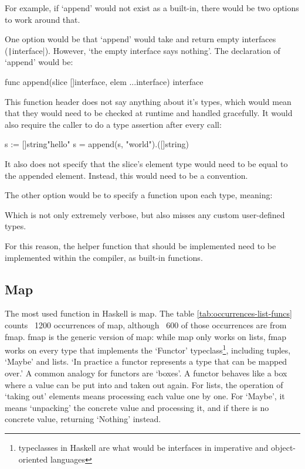 For example, if `append' would not exist as a built-in, there would be two options
to work around that.

One option would be that `append' would take and return empty interfaces
(\texttt|interface{}|). However, `the empty interface says
nothing'\autocite{empty-interface}. The declaration of `append' would be:
\begin{gocode}
  func append(slice []interface{}, elem ...interface{}) {}interface
\end{gocode}

This function header does not say anything about it's types, which would
mean that they would need to be checked at runtime and handled gracefully. It
would also require the caller to do a type assertion after every call:

\begin{gocode}
  s := []string{"hello"}
  s = append(s, "world").([]string)
\end{gocode}

It also does not specify that the slice's element type would need to be equal to
the appended element. Instead, this would need to be a convention.

The other option would be to specify a function upon each type, meaning:
\begin{gocode}
func appendInt(slice []int, elem ...int} []int
func appendString(slice []string, elem ...string} []string
...
\end{gocode}

Which is not only extremely verbose, but also misses any custom user-defined types.

For this reason, the helper function that should  be implemented need to
be implemented within the compiler, as built-in functions.

\subsection{Map}

The most used function in Haskell is map. The table \ref{tab:occurrences-list-funcs}
counts ~1200 occurrences of map, although ~600 of those occurrences are from
fmap. fmap is the generic version of map: while map only works on lists, fmap
works on every type that implements the `Functor' typeclass\footnote{typeclasses
    in Haskell are what would be interfaces in imperative and object-oriented
languages}, including tuples, `Maybe' and lists.
`In practice a functor represents a type that can be mapped over.'\autocite{functor-wiki}
A common analogy for functors are `boxes'. A functor behaves like a box where
a value can be put into and taken out again. For lists, the operation of `taking out'
elements means processing each value one by one. For `Maybe', it means `unpacking' the
concrete value and processing it, and if there is no concrete value, returning `Nothing'
instead.

